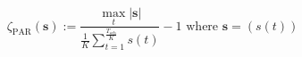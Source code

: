\begin{equation}
	\zeta_\text{PAR}(\textbf{s}) := \frac{\max_t \left| \textbf{s} \right|}{\frac{1}{K}\sum_{t=1}^{\frac{T_\text{sch}}{K}}{s}(t)} - 1
	\text{ where } \textbf{s} = ({s}(t))
\label{ch1:equ:peak-to-average-definition}
\end{equation}